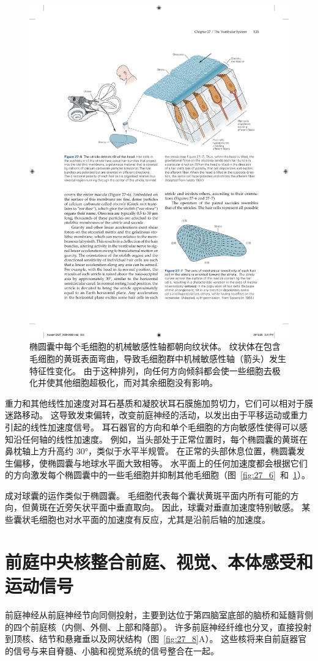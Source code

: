 \begin{figure}[htbp]
	\centering
	\includegraphics[width=0.6\linewidth]{chap27/fig_27_7}
	\caption{椭圆囊中每个毛细胞的机械敏感性轴都朝向纹状体。
		纹状体在包含毛细胞的黄斑表面弯曲，导致毛细胞群中机械敏感性轴（箭头）发生特征性变化。
		由于这种排列，向任何方向倾斜都会使一些细胞去极化并使其他细胞超极化，而对其余细胞没有影响\cite{spoendlin2016ultrastructure}。}
	\label{fig:27_7}
\end{figure}


重力和其他线性加速度对耳石基质和凝胶状耳石膜施加剪切力，它们可以相对于膜迷路移动。
这导致发束偏转，改变前庭神经的活动，以发出由于平移运动或重力引起的线性加速度信号。
耳石器官的方向和单个毛细胞的方向敏感性使得可以感知沿任何轴的线性加速度。
例如，当头部处于正常位置时，每个椭圆囊的黄斑在鼻枕轴上方升高约 30°，类似于水平半规管。
在正常的头部休息位置，椭圆囊发生偏移，使椭圆囊与地球水平面大致相等。
水平面上的任何加速度都会根据它们的方向激发每个椭圆囊中的一些毛细胞并抑制其他毛细胞（图~\ref{fig:27_6}~和~\ref{fig:27_7}）。


成对球囊的运作类似于椭圆囊。
毛细胞代表每个囊状黄斑平面内所有可能的方向，但黄斑在近旁矢状平面中垂直取向。
因此，球囊对垂直加速度特别敏感。
某些囊状毛细胞也对水平面的加速度有反应，尤其是沿前后轴的加速度。



\section{前庭中央核整合前庭、视觉、本体感受和运动信号}

前庭神经从前庭神经节向同侧投射，主要到达位于第四脑室底部的脑桥和延髓背侧的四个前庭核（内侧、外侧、上部和降部）。
许多前庭神经纤维也分叉，直接投射到顶核、结节和悬雍垂以及网状结构（图~\ref{fig:27_8}A）。 
这些核将来自前庭器官的信号与来自脊髓、小脑和视觉系统的信号整合在一起。


